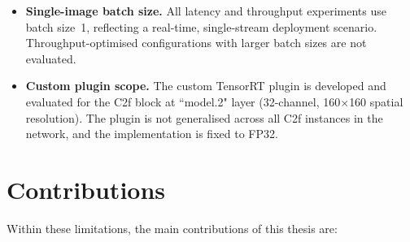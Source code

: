 \documentclass[12pt,a4paper]{report}
\begin{document}
\begin{itemize}
\item \textbf{Single-image batch size.}
All latency and throughput experiments use batch size~1, reflecting a real-time, single-stream deployment scenario.
Throughput-optimised configurations with larger batch sizes are not evaluated.

\item \textbf{Custom plugin scope.}
The custom TensorRT plugin is developed and evaluated for the C2f block at ``model.2" layer (32-channel, 160$\times$160 spatial
resolution).
The plugin is not generalised across all C2f instances in the network, and the implementation is fixed to FP32.

\end{itemize}

\section{Contributions}

Within these limitations, the main contributions of this thesis are:
\end{document}
